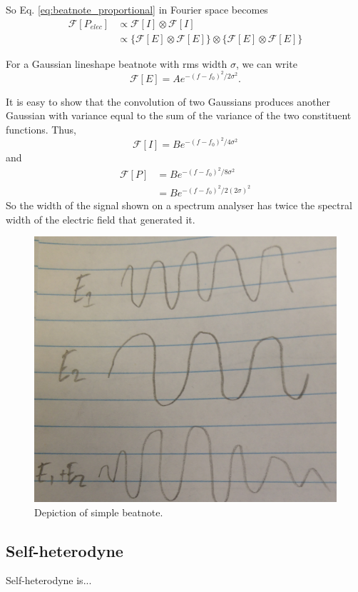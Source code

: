 So Eq. \ref{eq:beatnote_proportional} in Fourier space becomes
\begin{align}
\mathcal{F}[P_{elec}]&\propto \mathcal{F}[I]\otimes\mathcal{F}[I]\nonumber\\
&\propto \big\{\mathcal{F}[E] \otimes\mathcal{F}[E]\big\} \otimes\big\{\mathcal{F}[E] \otimes\mathcal{F}[E]\big\}
\end{align}

For a Gaussian lineshape beatnote with \gls{rms} width $\sigma$, we can write
\begin{equation}
\mathcal{F}[E] = A e^{-(f-f_0)^2/2\sigma^2}.
\end{equation}

It is easy to show that the convolution of two Gaussians produces another Gaussian with variance equal to the sum of the variance of the two constituent functions.
Thus,
\begin{equation}
\mathcal{F}[I] = B e^{-(f-f_0)^2/4\sigma^2}
\end{equation}
and
\begin{align}
\mathcal{F}[P] &= B e^{-(f-f_0)^2/8\sigma^2}\nonumber\\
&= B e^{-(f-f_0)^2/2(2\sigma)^2}
\end{align}
So the width of the signal shown on a spectrum analyser has twice the spectral width of the electric field that generated it.

\begin{figure}
\centering
\includegraphics[width=0.5\linewidth]{part1/Figs/beatnote.jpg}
\caption{Depiction of simple beatnote.}
\label{figure:simple_beatnote}
\end{figure}

\subsection{Self-heterodyne}

Self-heterodyne is...

